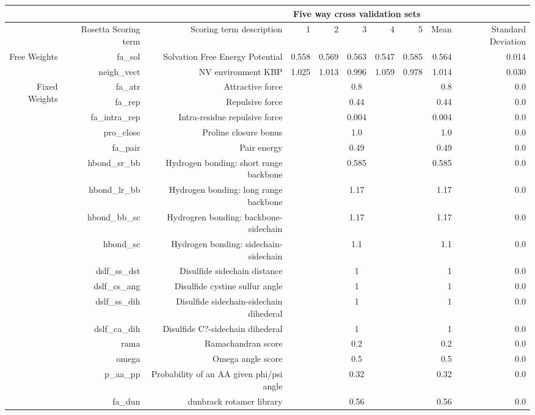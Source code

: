 
\begin{tabular}{|r|r|r|r|r|r|r|r|r|r|}
\hline
& & & \multicolumn{5}{c|}{Five way cross validation sets} & &  \\
\hline
& Rosetta Scoring term & Scoring term description & 1 & 2 & 3 & 4 & 5 & Mean & Standard Deviation \\
\hline
\multirow{2}{*}{Free Weights} & fa\_sol & Solvation Free Energy Potential & 0.558 & 0.569 & 0.563 & 0.547 & 0.585 & 0.564 & 0.014 \\
\cline{2-10}
& neigh\_vect & NV environment KBP & 1.025 & 1.013 & 0.996 & 1.059 & 0.978 & 1.014 & 0.030 \\
\hline
\multirow{17}{*}{Fixed Weights} & fa\_atr & Attractive force & \multicolumn{5}{c|}{0.8} & 0.8 & 0.0\\
\cline{2-10}
& fa\_rep & Repulsive force & \multicolumn{5}{c|}{0.44} & 0.44 & 0.0\\
\cline{2-10}
& fa\_intra\_rep & Intra-residue repulsive force & \multicolumn{5}{c|}{0.004} & 0.004 & 0.0\\
\cline{2-10}
& pro\_close & Proline closure bonus & \multicolumn{5}{c|}{1.0} & 1.0 & 0.0\\
\cline{2-10}
& fa\_pair & Pair energy & \multicolumn{5}{c|}{0.49} & 0.49 & 0.0\\
\cline{2-10}
& hbond\_sr\_bb & Hydrogen bonding: short range backbone & \multicolumn{5}{c|}{0.585} & 0.585 & 0.0\\
\cline{2-10}
& hbond\_lr\_bb & Hydrogen bonding: long range backbone & \multicolumn{5}{c|}{1.17} & 1.17 & 0.0\\
\cline{2-10}
& hbond\_bb\_sc & Hydrogren bonding: backbone-sidechain & \multicolumn{5}{c|}{1.17} & 1.17 & 0.0\\
\cline{2-10}
& hbond\_sc & Hydrogen bonding: sidechain-sidechain & \multicolumn{5}{c|}{1.1} & 1.1 & 0.0 \\
\cline{2-10}
& dslf\_ss\_dst & Disulfide sidechain distance & \multicolumn{5}{c|}{1} & 1 & 0.0\\
\cline{2-10}
& dslf\_cs\_ang & Disulfide cystine sulfur angle & \multicolumn{5}{c|}{1} & 1 & 0.0\\
\cline{2-10}
& dslf\_ss\_dih & Disulfide sidechain-sidechain dihederal & \multicolumn{5}{c|}{1} & 1 & 0.0\\
\cline{2-10}
& dslf\_ca\_dih & Disulfide C?-sidechain dihederal & \multicolumn{5}{c|}{1} & 1 & 0.0\\
\cline{2-10}
& rama & Ramachandran score & \multicolumn{5}{c|}{0.2} & 0.2 & 0.0\\
\cline{2-10}
& omega & Omega angle score & \multicolumn{5}{c|}{0.5} & 0.5 & 0.0\\
\cline{2-10}
& p\_aa\_pp & Probability of an AA given phi/psi angle & \multicolumn{5}{c|}{0.32} & 0.32 & 0.0 \\
\cline{2-10}
& fa\_dun & dunbrack rotamer library & \multicolumn{5}{c|}{0.56} & 0.56 & 0.0\\
\hline
\end{tabular}